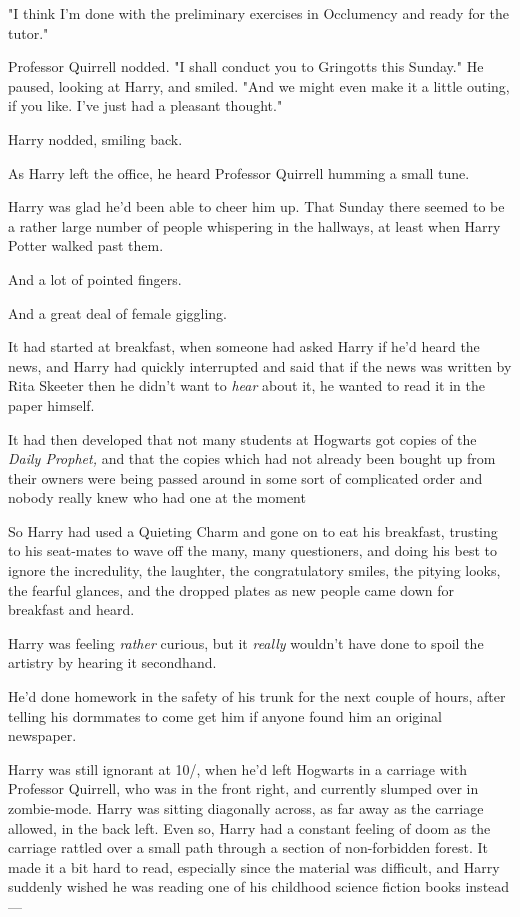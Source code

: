 "I think I'm done with the preliminary exercises in Occlumency and ready for
the tutor."

Professor Quirrell nodded. "I shall conduct you to Gringotts this Sunday." He
paused, looking at Harry, and smiled. "And we might even make it a little
outing, if you like. I've just had a pleasant thought."

Harry nodded, smiling back.

As Harry left the office, he heard Professor Quirrell humming a small tune.

Harry was glad he'd been able to cheer him up.
\sbreak
That Sunday there seemed to be a rather large number of people whispering in
the hallways, at least when Harry Potter walked past them.

And a lot of pointed fingers.

And a great deal of female giggling.

It had started at breakfast, when someone had asked Harry if he'd heard the
news, and Harry had quickly interrupted and said that if the news was written
by Rita Skeeter then he didn't want to \emph{hear} about it, he wanted to read
it in the paper himself.

It had then developed that not many students at Hogwarts got copies of the
\emph{Daily Prophet,} and that the copies which had not already been bought up
from their owners were being passed around in some sort of complicated order
and nobody really knew who had one at the moment{\el}

So Harry had used a Quieting Charm and gone on to eat his breakfast, trusting
to his seat-mates to wave off the many, many questioners, and doing his best to
ignore the incredulity, the laughter, the congratulatory smiles, the pitying
looks, the fearful glances, and the dropped plates as new people came down for
breakfast and heard.

Harry was feeling \emph{rather} curious, but it \emph{really} wouldn't have
done to spoil the artistry by hearing it secondhand.

He'd done homework in the safety of his trunk for the next couple of hours,
after telling his dormmates to come get him if anyone found him an original
newspaper.

Harry was still ignorant at 10\AM/, when he'd left Hogwarts in a carriage with
Professor Quirrell, who was in the front right, and currently slumped over in
zombie-mode. Harry was sitting diagonally across, as far away as the carriage
allowed, in the back left. Even so, Harry had a constant feeling of doom as the
carriage rattled over a small path through a section of non-forbidden forest.
It made it a bit hard to read, especially since the material was difficult, and
Harry suddenly wished he was reading one of his childhood science fiction books
instead\mbox{---}

